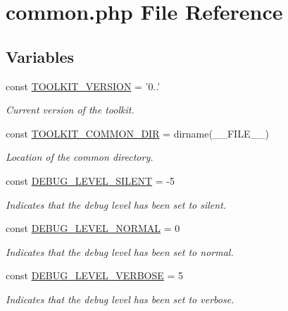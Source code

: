 \hypertarget{common_8php}{\section{common.\-php File Reference}
\label{common_8php}
}
\subsection*{Variables}
\begin{DoxyCompactItemize}
\item 
const \hyperlink{common_8php_a9eda8148b1aa1a156d4cb947a5bf4cae}{T\-O\-O\-L\-K\-I\-T\-\_\-\-V\-E\-R\-S\-I\-O\-N} = '0..'
\begin{DoxyCompactList}\small\item\em Current version of the toolkit. \end{DoxyCompactList}\item 
const \hyperlink{common_8php_aa4d5af32469e1957022a401beed654e2}{T\-O\-O\-L\-K\-I\-T\-\_\-\-C\-O\-M\-M\-O\-N\-\_\-\-D\-I\-R} = dirname(\-\_\-\-\_\-\-F\-I\-L\-E\-\_\-\-\_\-)
\begin{DoxyCompactList}\small\item\em Location of the common directory. \end{DoxyCompactList}\item 
const \hyperlink{common_8php_ad716f4611d7ac151f96d2ff10f681786}{D\-E\-B\-U\-G\-\_\-\-L\-E\-V\-E\-L\-\_\-\-S\-I\-L\-E\-N\-T} = -\/5
\begin{DoxyCompactList}\small\item\em Indicates that the debug level has been set to silent. \end{DoxyCompactList}\item 
const \hyperlink{common_8php_a412f8ed486afa7fea7c81b35d0db39ba}{D\-E\-B\-U\-G\-\_\-\-L\-E\-V\-E\-L\-\_\-\-N\-O\-R\-M\-A\-L} = 0
\begin{DoxyCompactList}\small\item\em Indicates that the debug level has been set to normal. \end{DoxyCompactList}\item 
const \hyperlink{common_8php_a3f6f7f3818bca5ef6263d121cecb584e}{D\-E\-B\-U\-G\-\_\-\-L\-E\-V\-E\-L\-\_\-\-V\-E\-R\-B\-O\-S\-E} = 5
\begin{DoxyCompactList}\small\item\em Indicates that the debug level has been set to verbose. \end{DoxyCompactList}\item 

\end{DoxyCompactItemize}
